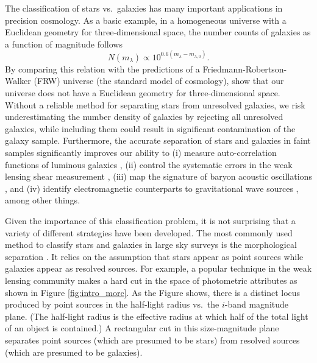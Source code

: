 The classification of stars vs.\ galaxies has many important applications in precision cosmology.
As a basic example, in a homogeneous universe with a Euclidean geometry for three-dimensional space,
the number counts of galaxies as a function of magnitude follows
\begin{equation}
N \left( m_{\lambda} \right) \propto 10^{ 0.6 \left( m_{\lambda} - m_{\lambda,0} \right) }.
\end{equation}
By comparing this relation with the predictions of a Friedmann-Robertson-Walker (FRW) universe
(\ie the standard model of cosmology),
\citet{yasuda2001galaxy} show that our universe does not have a Euclidean geometry for
three-dimensional space.
Without a reliable method for separating stars from unresolved galaxies, 
we risk underestimating the number density of galaxies by rejecting all unresolved galaxies,
while including them could result in significant contamination of the galaxy sample.
Furthermore, the accurate separation of stars and galaxies in faint samples
significantly improves our ability to
(i) measure auto-correlation functions of luminous galaxies \citep{ross2011ameliorating},
(ii) control the systematic errors in the weak lensing shear measurement \citep{soumagnac2015star},
(iii) map the signature of baryon acoustic oscillations \citep{anderson2014clustering}, and
(iv) identify electromagnetic counterparts to gravitational wave sources \citep{miller2017preparing},
among other things.

Given the importance of this classification problem, it is not surprising that a variety of
different strategies have been developed.
The most commonly used method to classify stars and galaxies in large sky surveys is the morphological separation
\citep{sebok1979optimal, kron1980photometry, valdes1982resolution, yee1991faint, vasconcellos2011decision,
henrion2011bayesian}.
It relies on the assumption that stars appear as point sources while galaxies appear as resolved sources.
For example, a popular technique in the weak lensing community \citep{Kaiser1995}
makes a hard cut in the space of photometric attributes as shown in Figure \ref{fig:intro_morc}.
As the Figure shows, there is a distinct locus
produced by point sources in the half-light radius vs.\ the $i$-band magnitude plane.
(The half-light radius is the effective radius at which half of the total light of an object is contained.)
A rectangular cut in this size-magnitude plane separates point sources
(which are presumed to be stars) from resolved sources (which are presumed to be galaxies).

